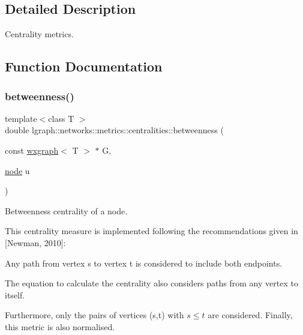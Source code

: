 \subsection{Detailed Description}
Centrality metrics. 

\subsection{Function Documentation}
\mbox{\label{namespacelgraph_1_1networks_1_1metrics_1_1centralities_a5a8a94d9361a49ffa657d8d6541be4be}} 
\subsubsection{\texorpdfstring{betweenness()}{betweenness()}\hspace{0.1cm}{\footnotesize\ttfamily [1/8]}}
{\footnotesize\ttfamily template$<$class T $>$ \\
double lgraph\+::networks\+::metrics\+::centralities\+::betweenness (\begin{DoxyParamCaption}\item[{const \hyperlink{classlgraph_1_1wxgraph}{wxgraph}$<$ T $>$ $\ast$}]{G,  }\item[{\hyperlink{namespacelgraph_a397169dd66adf725210a30fb7251773e}{node}}]{u }\end{DoxyParamCaption})}



Betweenness centrality of a node. 

This centrality measure is implemented following the recommendations given in \mbox{[}Newman, 2010\mbox{]}\+:
\begin{DoxyItemize}
\item Any path from vertex \textquotesingle{}s\textquotesingle{} to vertex \textquotesingle{}t\textquotesingle{} is considered to include both endpoints.
\item The equation to calculate the centrality also considers paths from any vertex to itself.
\end{DoxyItemize}

Furthermore, only the pairs of vertices (s,t) with $s \le t$ are considered. Finally, this metric is also normalised.

